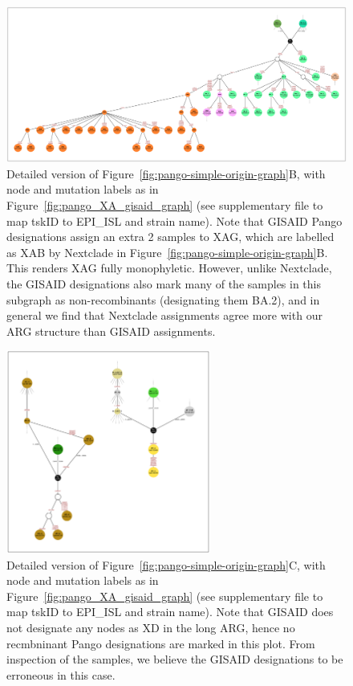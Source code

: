 \documentclass{article}
\begin{document}
\begin{figure} \centering
\includegraphics[width=\textwidth]{figures/Pango_XAG_gisaid_large_graph.pdf}
\caption{\label{fig:pango_XAG_gisaid_graph}
Detailed version of Figure~\ref{fig:pango-simple-origin-graph}B, with node and mutation labels as in
Figure~\ref{fig:pango_XA_gisaid_graph} (see supplementary file \protect{}
to map tskID to EPI\_ISL and strain name).
Note that GISAID Pango designations assign an extra 2 samples to XAG, which are labelled as XAB
by Nextclade in Figure~\ref{fig:pango-simple-origin-graph}B. This renders XAG fully monophyletic.
However, unlike Nextclade, the GISAID designations also mark many of the samples in this subgraph
as non-recombinants (designating them BA.2), and in general we find that Nextclade assignments
agree more with our ARG structure than GISAID assignments.
}
\end{figure}

\begin{figure} \centering
\includegraphics[width=0.6\textwidth]{figures/Pango_XD_gisaid_large_graph.pdf}
\caption{\label{fig:pango_XD_gisaid_graph}
Detailed version of Figure~\ref{fig:pango-simple-origin-graph}C, with node and mutation labels as in
Figure~\ref{fig:pango_XA_gisaid_graph} (see supplementary file \protect{}
to map tskID to EPI\_ISL and strain name).
Note that GISAID does not designate any nodes as XD in the long ARG, hence no recmbninant Pango designations
are marked in this plot. From inspection of the samples, we believe the GISAID designations to be erroneous
in this case.
}
\end{figure}
\end{document}
